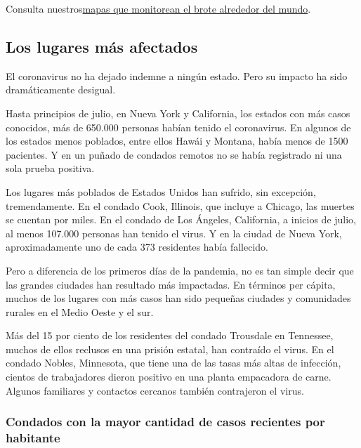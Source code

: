 Consulta
nuestros\href{https://www.nytimes.com/interactive/2020/world/coronavirus-maps.html}{mapas
que monitorean el brote alrededor del mundo}.

\hypertarget{los-lugares-muxe1s-afectados}{%
\subsection{Los lugares más
afectados}\label{los-lugares-muxe1s-afectados}}

El coronavirus no ha dejado indemne a ningún estado. Pero su impacto ha
sido dramáticamente desigual.

Hasta principios de julio, en Nueva York y California, los estados con
más casos conocidos, más de 650.000 personas habían tenido el
coronavirus. En algunos de los estados menos poblados, entre ellos Hawái
y Montana, había menos de 1500 pacientes. Y en un puñado de condados
remotos no se había registrado ni una sola prueba positiva.

Los lugares más poblados de Estados Unidos han sufrido, sin excepción,
tremendamente. En el condado Cook, Illinois, que incluye a Chicago, las
muertes se cuentan por miles. En el condado de Los Ángeles, California,
a inicios de julio, al menos 107.000 personas han tenido el virus. Y en
la ciudad de Nueva York, aproximadamente uno de cada 373 residentes
había fallecido.

Pero a diferencia de los primeros días de la pandemia, no es tan simple
decir que las grandes ciudades han resultado más impactadas. En términos
per cápita, muchos de los lugares con más casos han sido pequeñas
ciudades y comunidades rurales en el Medio Oeste y el sur.

Más del 15 por ciento de los residentes del condado Trousdale en
Tennessee, muchos de ellos reclusos en una prisión estatal, han
contraído el virus. En el condado Nobles, Minnesota, que tiene una de
las tasas más altas de infección, cientos de trabajadores dieron
positivo en una planta empacadora de carne. Algunos familiares y
contactos cercanos también contrajeron el virus.

\hypertarget{condados-con-la-mayor-cantidad-de-casos-recientes-por-habitante}{%
\subsubsection{Condados con la mayor cantidad de casos recientes por
habitante}\label{condados-con-la-mayor-cantidad-de-casos-recientes-por-habitante}}

